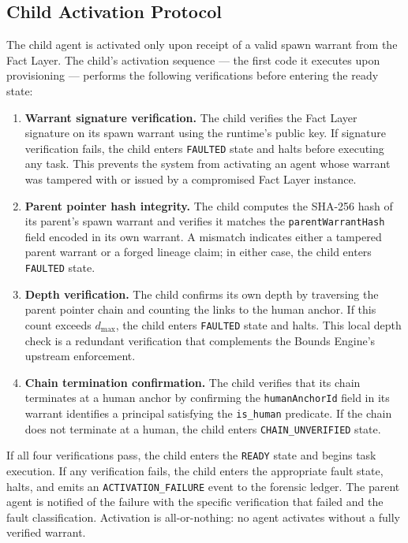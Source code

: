 \subsection{Child Activation Protocol}

The child agent is activated only upon receipt of a valid spawn warrant from the Fact Layer. The child's activation sequence — the first code it executes upon provisioning — performs the following verifications before entering the ready state:

\begin{enumerate}
    \item \textbf{Warrant signature verification.} The child verifies the Fact Layer signature on its spawn warrant using the runtime's public key. If signature verification fails, the child enters \texttt{FAULTED} state and halts before executing any task. This prevents the system from activating an agent whose warrant was tampered with or issued by a compromised Fact Layer instance.
    \item \textbf{Parent pointer hash integrity.} The child computes the SHA-256 hash of its parent's spawn warrant and verifies it matches the \texttt{parentWarrantHash} field encoded in its own warrant. A mismatch indicates either a tampered parent warrant or a forged lineage claim; in either case, the child enters \texttt{FAULTED} state.
    \item \textbf{Depth verification.} The child confirms its own depth by traversing the parent pointer chain and counting the links to the human anchor. If this count exceeds $d_{\max}$, the child enters \texttt{FAULTED} state and halts. This local depth check is a redundant verification that complements the Bounds Engine's upstream enforcement.
    \item \textbf{Chain termination confirmation.} The child verifies that its chain terminates at a human anchor by confirming the \texttt{humanAnchorId} field in its warrant identifies a principal satisfying the \texttt{is\_human} predicate. If the chain does not terminate at a human, the child enters \texttt{CHAIN\_UNVERIFIED} state.
\end{enumerate}

If all four verifications pass, the child enters the \texttt{READY} state and begins task execution. If any verification fails, the child enters the appropriate fault state, halts, and emits an \texttt{ACTIVATION\_FAILURE} event to the forensic ledger. The parent agent is notified of the failure with the specific verification that failed and the fault classification. Activation is all-or-nothing: no agent activates without a fully verified warrant.

